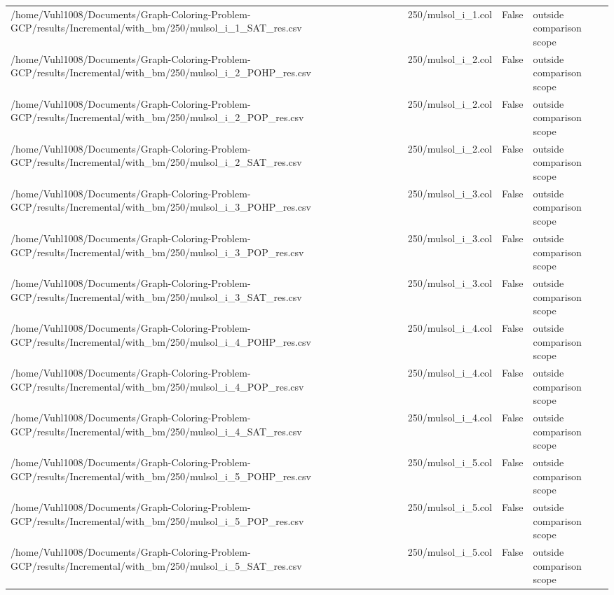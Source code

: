 \begin{table}[htbp]
\begin{tabular}{llll}
/home/Vuhl1008/Documents/Graph-Coloring-Problem-GCP/results/Incremental/with\_bm/250/mulsol\_i\_1\_SAT\_res.csv & 250/mulsol\_i\_1.col & False & outside comparison scope \\
/home/Vuhl1008/Documents/Graph-Coloring-Problem-GCP/results/Incremental/with\_bm/250/mulsol\_i\_2\_POHP\_res.csv & 250/mulsol\_i\_2.col & False & outside comparison scope \\
/home/Vuhl1008/Documents/Graph-Coloring-Problem-GCP/results/Incremental/with\_bm/250/mulsol\_i\_2\_POP\_res.csv & 250/mulsol\_i\_2.col & False & outside comparison scope \\
/home/Vuhl1008/Documents/Graph-Coloring-Problem-GCP/results/Incremental/with\_bm/250/mulsol\_i\_2\_SAT\_res.csv & 250/mulsol\_i\_2.col & False & outside comparison scope \\
/home/Vuhl1008/Documents/Graph-Coloring-Problem-GCP/results/Incremental/with\_bm/250/mulsol\_i\_3\_POHP\_res.csv & 250/mulsol\_i\_3.col & False & outside comparison scope \\
/home/Vuhl1008/Documents/Graph-Coloring-Problem-GCP/results/Incremental/with\_bm/250/mulsol\_i\_3\_POP\_res.csv & 250/mulsol\_i\_3.col & False & outside comparison scope \\
/home/Vuhl1008/Documents/Graph-Coloring-Problem-GCP/results/Incremental/with\_bm/250/mulsol\_i\_3\_SAT\_res.csv & 250/mulsol\_i\_3.col & False & outside comparison scope \\
/home/Vuhl1008/Documents/Graph-Coloring-Problem-GCP/results/Incremental/with\_bm/250/mulsol\_i\_4\_POHP\_res.csv & 250/mulsol\_i\_4.col & False & outside comparison scope \\
/home/Vuhl1008/Documents/Graph-Coloring-Problem-GCP/results/Incremental/with\_bm/250/mulsol\_i\_4\_POP\_res.csv & 250/mulsol\_i\_4.col & False & outside comparison scope \\
/home/Vuhl1008/Documents/Graph-Coloring-Problem-GCP/results/Incremental/with\_bm/250/mulsol\_i\_4\_SAT\_res.csv & 250/mulsol\_i\_4.col & False & outside comparison scope \\
/home/Vuhl1008/Documents/Graph-Coloring-Problem-GCP/results/Incremental/with\_bm/250/mulsol\_i\_5\_POHP\_res.csv & 250/mulsol\_i\_5.col & False & outside comparison scope \\
/home/Vuhl1008/Documents/Graph-Coloring-Problem-GCP/results/Incremental/with\_bm/250/mulsol\_i\_5\_POP\_res.csv & 250/mulsol\_i\_5.col & False & outside comparison scope \\
/home/Vuhl1008/Documents/Graph-Coloring-Problem-GCP/results/Incremental/with\_bm/250/mulsol\_i\_5\_SAT\_res.csv & 250/mulsol\_i\_5.col & False & outside comparison scope \\

\end{tabular}
\end{table}
